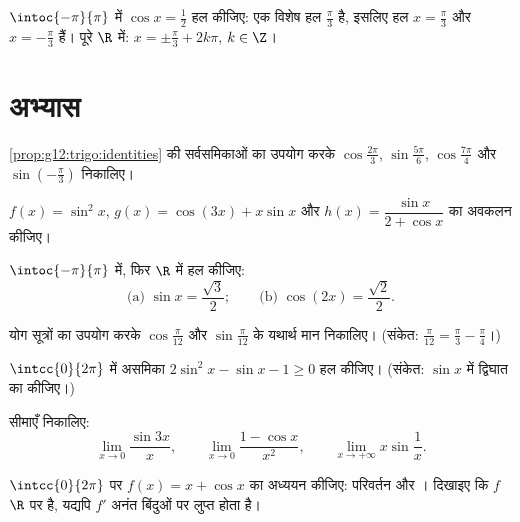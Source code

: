 \begin{example}\label{ex:g12:trigo:equation}
$\intoc{-\pi}{\pi}$ में $\cos x = \frac12$ हल कीजिए: एक विशेष हल $\frac\pi3$ है, इसलिए हल $x = \frac\pi3$ और $x = -\frac\pi3$ हैं।
पूरे $\R$ में: $x = \pm\frac\pi3 + 2k\pi$, $k \in \Z$।
\end{example}

\section{अभ्यास}

\begin{exercise}[$\star$]\label{exo:g12:trigo:1}
\cref{prop:g12:trigo:identities} की सर्वसमिकाओं का उपयोग करके $\cos\frac{2\pi}{3}$, $\sin\frac{5\pi}{6}$, $\cos\frac{7\pi}{4}$ और $\sin\left(-\frac{\pi}{3}\right)$ निकालिए।
\end{exercise}

\begin{exercise}[$\star$]\label{exo:g12:trigo:2}
$f(x) = \sin^2 x$, $g(x) = \cos(3x) + x\sin x$ और $h(x) = \dfrac{\sin x}{2 + \cos x}$ का अवकलन कीजिए।
\end{exercise}

\begin{exercise}[$\star$]\label{exo:g12:trigo:3}
$\intoc{-\pi}{\pi}$ में, फिर $\R$ में हल कीजिए:
\[
\text{(a) } \sin x = \frac{\sqrt3}{2};
\qquad
\text{(b) } \cos\left(2x\right) = \frac{\sqrt2}{2} .
\]
\end{exercise}

\begin{exercise}[$\star\star$]\label{exo:g12:trigo:4}
योग सूत्रों का उपयोग करके $\cos\frac{\pi}{12}$ और $\sin\frac{\pi}{12}$ के यथार्थ मान निकालिए। (संकेत:
$\frac{\pi}{12} = \frac{\pi}{3} - \frac{\pi}{4}$।)
\end{exercise}

\begin{exercise}[$\star\star$]\label{exo:g12:trigo:5}
$\intcc{0}{2\pi}$ में असमिका $2\sin^2 x - \sin x - 1 \geq 0$ हल कीजिए। (संकेत: $\sin x$ में द्विघात का 
कीजिए।)
\end{exercise}

\begin{exercise}[$\star\star$]\label{exo:g12:trigo:6}
सीमाएँ निकालिए:
\[
\lim_{x\to0} \frac{\sin 3x}{x}, \qquad
\lim_{x\to0} \frac{1 - \cos x}{x^2}, \qquad
\lim_{x\to+\infty} x \sin\frac{1}{x}.
\]
\end{exercise}

\begin{exercise}[$\star\star$]\label{exo:g12:trigo:7}
$\intcc{0}{2\pi}$ पर  $f(x) = x + \cos x$ का अध्ययन कीजिए: परिवर्तन और । दिखाइए कि $f$
$\R$ पर  है, यद्यपि $f'$ अनंत बिंदुओं पर लुप्त होता है।
\end{exercise}

